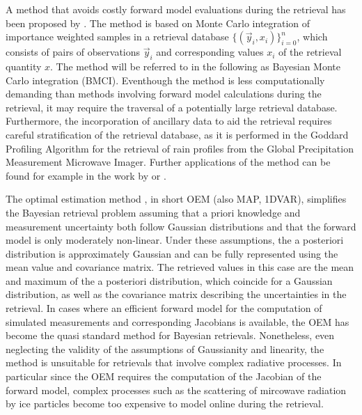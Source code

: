 \documentclass[journal abbreviation, manuscript]{copernicus}
\begin{document}
A method that avoids costly forward model evaluations during the retrieval has
been proposed by \cite{kummerow_1}. The method is based on Monte Carlo
integration of importance weighted samples in a retrieval database
$\{(\vec{y}_i, x_i)\}_{i = 0}^n$, which consists of pairs of observations
$\vec{y}_i$ and corresponding values $x_i$ of the retrieval quantity $x$. The
method will be referred to in the following as Bayesian Monte Carlo integration
(BMCI). Eventhough the method is less computationally demanding than methods
involving forward model calculations during the retrieval, it may require the
traversal of a potentially large retrieval database. Furthermore, the
incorporation of ancillary data to aid the retrieval requires careful
stratification of the retrieval database, as it is performed in the Goddard
Profiling Algorithm \citep{gprof} for the retrieval of rain profiles from the
Global Precipitation Measurement Microwave Imager. Further applications of the
method can be found for example in the work by \cite{rydberg_1} or
\cite{evans_2}.

The optimal estimation method \citep{rodgers}, in short OEM (also MAP, 1DVAR),
simplifies the Bayesian retrieval problem assuming that a priori knowledge and
measurement uncertainty both follow Gaussian distributions and that the forward
model is only moderately non-linear. Under these assumptions, the a posteriori
distribution is approximately Gaussian and can be fully represented using the
mean value and covariance matrix. The retrieved values in this case are the mean
and maximum of the a posteriori distribution, which coincide for a Gaussian
distribution, as well as the covariance matrix describing the uncertainties in
the retrieval. In cases where an efficient forward model for the computation of
simulated measurements and corresponding Jacobians is available, the OEM has
become the quasi standard method for Bayesian retrievals. Nonetheless, even
neglecting the validity of the assumptions of Gaussianity and linearity, the
method is unsuitable for retrievals that involve complex radiative processes.
In particular since the OEM requires the computation of the Jacobian of the
forward model, complex processes such as the scattering of mircowave radiation
by ice particles become too expensive to model online during the retrieval.
\end{document}
